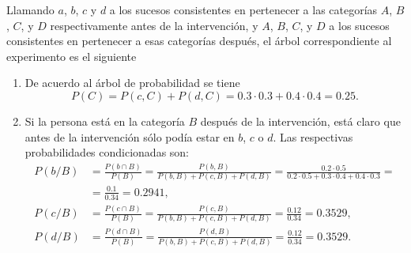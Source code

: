 {Llamando $a$, $b$, $c$ y $d$ a los sucesos consistentes en pertenecer a las categorías $A$, $B$, $C$, y $D$ respectivamente antes de la
intervención, y $A$, $B$, $C$, y $D$ a los sucesos consistentes en pertenecer a esas categorías después, el árbol correspondiente al experimento es el siguiente


\begin{enumerate}
\item De acuerdo al árbol de probabilidad se tiene
\[
P(C) = P(c,C) + P(d,C) = 0.3 \cdot 0.3 + 0.4 \cdot 0.4 = 0.25.
\]

\item Si la persona está en la categoría $B$ después de la intervención, está claro que antes de la intervención sólo podía estar en $b$, $c$ o $d$. Las respectivas probabilidades condicionadas son:
\begin{align*}
P(b/B) &= \frac{P(b\cap B)}{P(B)} = \frac{P(b,B)}{P(b,B)+P(c,B)+P(d,B)} = \frac{0.2 \cdot 0.5}{0.2 \cdot 0.5+0.3 \cdot 0.4+0.4 \cdot 0.3} = \\
& = \frac{0.1}{0.34} = 0.2941,\\
P(c/B) &= \frac{P(c\cap B)}{P(B)} = \frac{P(c,B)}{P(b,B)+P(c,B)+P(d,B)} = \frac{0.12}{0.34} = 0.3529,\\
P(d/B) &= \frac{P(d\cap B)}{P(B)} = \frac{P(d,B)}{P(b,B)+P(c,B)+P(d,B)} = \frac{0.12}{0.34} = 0.3529.
\end{align*}


\end{enumerate}}
